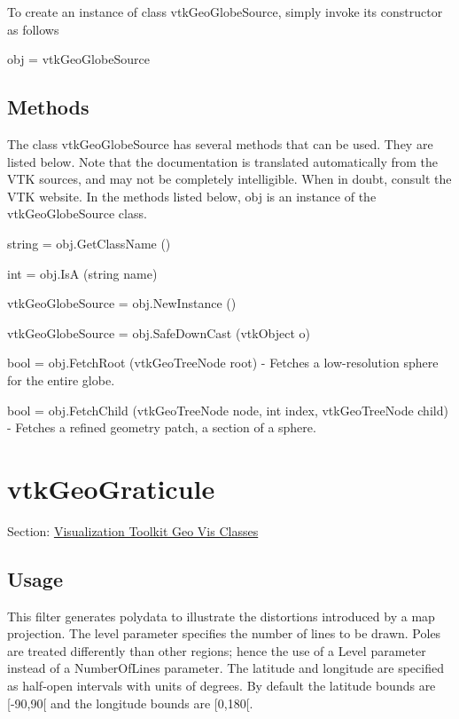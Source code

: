 To create an instance of class vtk\-Geo\-Globe\-Source, simply invoke its constructor as follows \begin{DoxyVerb}  obj = vtkGeoGlobeSource
\end{DoxyVerb}
 \hypertarget{vtkwidgets_vtkxyplotwidget_Methods}{}\subsection{Methods}\label{vtkwidgets_vtkxyplotwidget_Methods}
The class vtk\-Geo\-Globe\-Source has several methods that can be used. They are listed below. Note that the documentation is translated automatically from the V\-T\-K sources, and may not be completely intelligible. When in doubt, consult the V\-T\-K website. In the methods listed below, {\ttfamily obj} is an instance of the vtk\-Geo\-Globe\-Source class. 
\begin{DoxyItemize}
\item {\ttfamily string = obj.\-Get\-Class\-Name ()}  
\item {\ttfamily int = obj.\-Is\-A (string name)}  
\item {\ttfamily vtk\-Geo\-Globe\-Source = obj.\-New\-Instance ()}  
\item {\ttfamily vtk\-Geo\-Globe\-Source = obj.\-Safe\-Down\-Cast (vtk\-Object o)}  
\item {\ttfamily bool = obj.\-Fetch\-Root (vtk\-Geo\-Tree\-Node root)} -\/ Fetches a low-\/resolution sphere for the entire globe.  
\item {\ttfamily bool = obj.\-Fetch\-Child (vtk\-Geo\-Tree\-Node node, int index, vtk\-Geo\-Tree\-Node child)} -\/ Fetches a refined geometry patch, a section of a sphere.  
\end{DoxyItemize}\hypertarget{vtkgeovis_vtkgeograticule}{}\section{vtk\-Geo\-Graticule}\label{vtkgeovis_vtkgeograticule}
Section\-: \hyperlink{sec_vtkgeovis}{Visualization Toolkit Geo Vis Classes} \hypertarget{vtkwidgets_vtkxyplotwidget_Usage}{}\subsection{Usage}\label{vtkwidgets_vtkxyplotwidget_Usage}
This filter generates polydata to illustrate the distortions introduced by a map projection. The level parameter specifies the number of lines to be drawn. Poles are treated differently than other regions; hence the use of a Level parameter instead of a Number\-Of\-Lines parameter. The latitude and longitude are specified as half-\/open intervals with units of degrees. By default the latitude bounds are \mbox{[}-\/90,90\mbox{[} and the longitude bounds are \mbox{[}0,180\mbox{[}.

